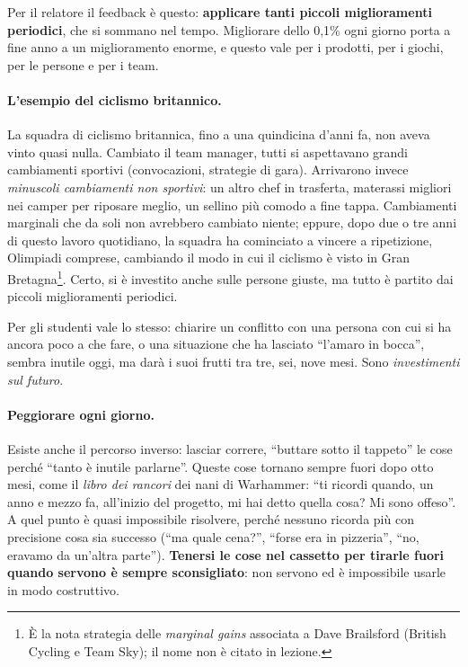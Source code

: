 Per il relatore il feedback è questo: \textbf{applicare tanti piccoli
miglioramenti periodici}, che si sommano nel tempo. Migliorare dello 0,1\%
ogni giorno porta a fine anno a un miglioramento enorme, e questo vale per i
prodotti, per i giochi, per le persone e per i team.

\paragraph{L'esempio del ciclismo britannico.} La squadra di ciclismo
britannica, fino a una quindicina d'anni fa, non aveva vinto quasi nulla.
Cambiato il team manager, tutti si aspettavano grandi cambiamenti sportivi
(convocazioni, strategie di gara). Arrivarono invece \emph{minuscoli
cambiamenti non sportivi}: un altro chef in trasferta, materassi migliori nei
camper per riposare meglio, un sellino più comodo a fine tappa. Cambiamenti
marginali che da soli non avrebbero cambiato niente; eppure, dopo due o tre
anni di questo lavoro quotidiano, la squadra ha cominciato a vincere a
ripetizione, Olimpiadi comprese, cambiando il modo in cui il ciclismo è
visto in Gran Bretagna\footnote{È la nota strategia delle \emph{marginal
gains} associata a Dave Brailsford (British Cycling e Team Sky); il nome non
è citato in lezione.}. Certo, si è investito anche sulle persone giuste, ma
tutto è partito dai piccoli miglioramenti periodici.

Per gli studenti vale lo stesso: chiarire un conflitto con una persona con
cui si ha ancora poco a che fare, o una situazione che ha lasciato
``l'amaro in bocca'', sembra inutile oggi, ma darà i suoi frutti tra tre, sei,
nove mesi. Sono \emph{investimenti sul futuro}.

\paragraph{Peggiorare ogni giorno.} Esiste anche il percorso inverso:
lasciar correre, ``buttare sotto il tappeto'' le cose perché ``tanto è
inutile parlarne''. Queste cose tornano sempre fuori dopo otto mesi, come il
\emph{libro dei rancori} dei nani di Warhammer: ``ti ricordi quando, un anno
e mezzo fa, all'inizio del progetto, mi hai detto quella cosa? Mi sono
offeso''. A quel punto è quasi impossibile risolvere, perché nessuno ricorda
più con precisione cosa sia successo (``ma quale cena?'', ``forse era in
pizzeria'', ``no, eravamo da un'altra parte''). \textbf{Tenersi le cose nel
cassetto per tirarle fuori quando servono è sempre sconsigliato}: non servono
ed è impossibile usarle in modo costruttivo.

